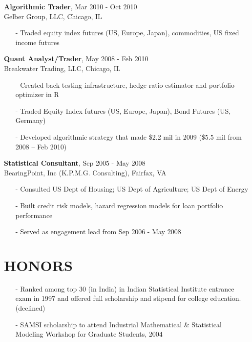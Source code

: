 \documentclass[11pt]{res} %
\begin{document}
\begin{resume}
{\bf{Algorithmic Trader}}, \hfill Mar 2010 - Oct 2010 \\
Gelber Group, LLC, Chicago, IL
   \begin{itemize} \itemsep -2pt %
   \item[-] Traded equity index futures (US, Europe, Japan), commodities, US fixed income futures
   \end{itemize}

{\bf{Quant Analyst/Trader}}, \hfill May 2008 - Feb 2010 \\
Breakwater Trading, LLC, Chicago, IL
   \begin{itemize} \itemsep -2pt %
   \item[-] Created back-testing infrastructure, hedge ratio estimator and portfolio optimizer in R
   \item[-] Traded Equity Index futures (US, Europe, Japan), Bond Futures (US, Germany)
   \item[-] Developed algorithmic strategy that made \$2.2 mil in 2009 (\$5.5 mil from
2008 – Feb 2010)
   \end{itemize}

{\bf{Statistical Consultant}}, \hfill Sep 2005 - May 2008 \\
BearingPoint, Inc (K.P.M.G. Consulting), Fairfax, VA
   \begin{itemize} \itemsep -2pt %
   \item[-] Consulted US Dept of Housing; US Dept of Agriculture; US Dept of Energy
   \item[-] Built credit risk models, hazard regression models for loan portfolio performance
   \item[-] Served as engagement lead from Sep 2006 - May 2008
   \end{itemize}

\section{HONORS} 
\begin{itemize}[leftmargin=*] \itemsep -2pt
\item[-] Ranked among top 30 (in India) in Indian Statistical Institute entrance exam in 1997 and offered full scholarship and stipend for college education. (declined)
\item[-] SAMSI scholarship to attend Industrial Mathematical \& Statistical Modeling Workshop for Graduate Students, 2004
\end{itemize}


\end{resume}
\end{document}

